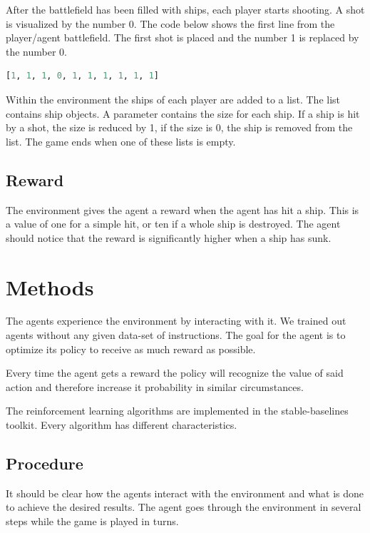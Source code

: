 \documentclass[sigconf]{acmart}
\begin{document}
\vspace{2.5mm}
After the battlefield has been filled with ships, each player starts shooting.
A shot is visualized by the number 0. The code below shows the first line from the player/agent battlefield. The first shot is placed and the number 1 is replaced by the number 0.
\vspace{2.5mm}

\begin{lstlisting}[language=Python, caption=A line with a hit mark]
[1, 1, 1, 0, 1, 1, 1, 1, 1, 1]
\end{lstlisting}
\vspace{2.5mm}
Within the environment the ships of each player are added to a list.
The list contains ship objects. A parameter contains the size for each ship. If a ship is hit by a shot, the size is reduced by 1, if the size is 0, the ship is removed from the list.
The game ends when one of these lists is empty.


\subsection{Reward}
The environment gives the agent a reward when the agent has hit a ship. 
This is a value of one for a simple hit, or ten if a whole ship is destroyed.
The agent should notice that the reward is significantly higher when a ship has sunk.


\vspace{2.5mm}
\section{Methods}
The agents experience the environment by interacting with it. 
We trained out agents without any given data-set of instructions. 
The goal for the agent is to optimize its policy to receive as much reward as possible. 

Every time the agent gets a reward the policy will recognize the value of said action and therefore increase it probability in similar circumstances.

The reinforcement learning algorithms are implemented in the stable-baselines toolkit. Every algorithm has different characteristics.

\subsection{Procedure}
It should be clear how the agents interact with the environment and what is done to achieve the desired results.
The agent goes through the environment in several steps while the game is played in turns.
\end{document}
